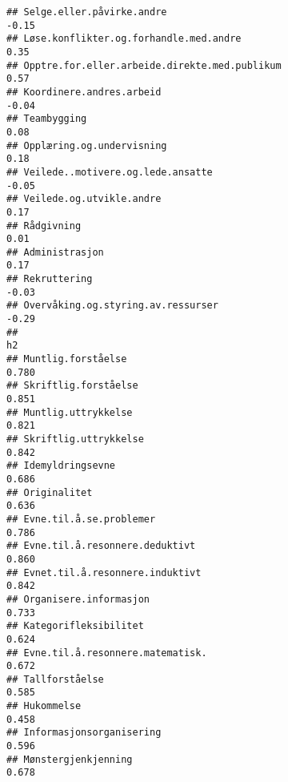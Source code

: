 \documentclass[
]{article}
\begin{document}
\begin{verbatim}
## Selge.eller.påvirke.andre                                                        -0.15
## Løse.konflikter.og.forhandle.med.andre                                            0.35
## Opptre.for.eller.arbeide.direkte.med.publikum                                     0.57
## Koordinere.andres.arbeid                                                         -0.04
## Teambygging                                                                       0.08
## Opplæring.og.undervisning                                                         0.18
## Veilede..motivere.og.lede.ansatte                                                -0.05
## Veilede.og.utvikle.andre                                                          0.17
## Rådgivning                                                                        0.01
## Administrasjon                                                                    0.17
## Rekruttering                                                                     -0.03
## Overvåking.og.styring.av.ressurser                                               -0.29
##                                                                                     h2
## Muntlig.forståelse                                                               0.780
## Skriftlig.forståelse                                                             0.851
## Muntlig.uttrykkelse                                                              0.821
## Skriftlig.uttrykkelse                                                            0.842
## Idemyldringsevne                                                                 0.686
## Originalitet                                                                     0.636
## Evne.til.å.se.problemer                                                          0.786
## Evne.til.å.resonnere.deduktivt                                                   0.860
## Evnet.til.å.resonnere.induktivt                                                  0.842
## Organisere.informasjon                                                           0.733
## Kategorifleksibilitet                                                            0.624
## Evne.til.å.resonnere.matematisk.                                                 0.672
## Tallforståelse                                                                   0.585
## Hukommelse                                                                       0.458
## Informasjonsorganisering                                                         0.596
## Mønstergjenkjenning                                                              0.678

\end{verbatim}
\end{document}
